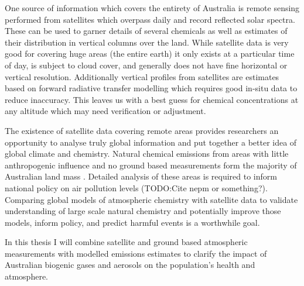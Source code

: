 One source of information which covers the entirety of Australia is remote sensing performed from satellites which overpass daily and record reflected solar spectra.
These can be used to garner details of several chemicals as well as estimates of their distribution in vertical columns over the land.
While satellite data is very good for covering huge areas (the entire earth) it only exists at a particular time of day, is subject to cloud cover, and generally does not have fine horizontal or vertical resolution.
Additionally vertical profiles from satellites are estimates based on forward radiative transfer modelling which requires good in-situ data to reduce inaccuracy.
This leaves us with a best guess for chemical concentrations at any altitude which may need verification or adjustment.

The existence of satellite data covering remote areas provides researchers an opportunity to analyse truly global information and put together a better idea of global climate and chemistry.
Natural chemical emissions from areas with little anthropogenic influence and no ground based measurements form the majority of Australian land mass \cite{VanDerA_2008}.
Detailed analysis of these areas is required to inform national policy on air pollution levels (TODO:Cite nepm or something?).   
Comparing global models of atmospheric chemistry with satellite data to validate understanding of large scale natural chemistry and potentially improve those models, inform policy, and predict harmful events is a worthwhile goal.

In this thesis I will combine satellite and ground based atmospheric measurements with modelled emissions estimates to clarify the impact of Australian biogenic gases and aerosols on the population's health and atmosphere.